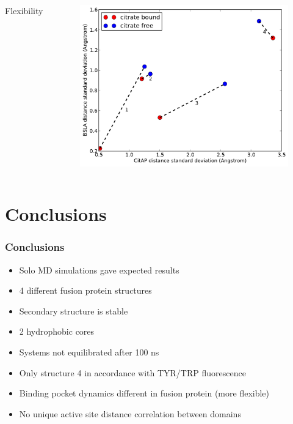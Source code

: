 \documentclass[english]{beamer}
\begin{document}
\begin{frame}
\begin{columns}[]
        \vfill
        \centering
        Flexibility
        \begin{figure}
            \includegraphics[width=\textwidth]{figures/CitAP_BSLA_distance/BSLA_CitAP_analyzed_with_standard_deviation.pdf}  
        \end{figure}      

    \end{columns}    

    \vfill 

\end{frame}        
 

\section{Conclusions}

\begin{frame}
    \frametitle{Conclusions}

    \begin{itemize}
        \item<1-> Solo MD simulations gave expected results
        \item<2-> 4 different fusion protein structures
        \item<3-> Secondary structure is stable
        \item<4-> 2 hydrophobic cores
        \item<5-> Systems not equilibrated after 100 ns
        \item<6-> Only structure 4 in accordance with TYR/TRP fluorescence
        \item<7-> Binding pocket dynamics different in fusion protein (more flexible)
        \item<8-> No unique active site distance correlation between domains
    \end{itemize}

\end{frame}        
\end{document}
